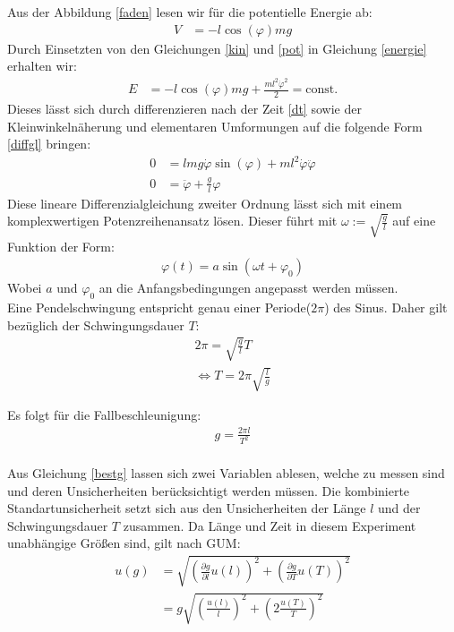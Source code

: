 Aus der Abbildung \ref{faden} lesen wir für die potentielle Energie ab:
\begin{align}
V&=-l \cos (\varphi) m g
\label{pot}
\end{align}
Durch Einsetzten von den Gleichungen \cref{kin} und \cref{pot} in Gleichung \cref{energie} erhalten wir:
\begin{align}
E&=-l \cos (\varphi) m g +\frac{ml^2\dot{\varphi}^2}{2}=\textrm{const.}
\end{align}
Dieses lässt sich durch differenzieren nach der Zeit \cref{dt} sowie der Kleinwinkelnäherung und elementaren Umformungen auf die folgende Form \cref{diffgl} bringen:
\begin{align}
	0&=lmg \dot{\varphi}\sin (\varphi) +ml^2 \dot{\varphi} \ddot{\varphi}
	\label{dt} \\
	0&=\ddot{\varphi}+\frac{g}{l} \varphi
	\label{diffgl}
\end{align}
Diese lineare Differenzialgleichung zweiter Ordnung lässt sich mit einem komplexwertigen Potenzreihenansatz lösen. Dieser führt mit $\omega:=\sqrt{\frac{g}{l}}$ auf eine Funktion der Form: 
\begin{align}
\varphi(t)=a \sin (\omega t + \varphi_0)
\end{align}
Wobei $a$ und $\varphi_0$ an die Anfangsbedingungen angepasst werden müssen.\\
Eine Pendelschwingung entspricht genau einer Periode($2\pi$) des Sinus. Daher gilt bezüglich der Schwingungsdauer $T$:
\begin{align}
	2\pi = \sqrt{\frac{g}{l}} T \\
	\Leftrightarrow T= 2 \pi \sqrt{\frac{l}{g}}
\end{align}

Es folgt für die Fallbeschleunigung:
\begin{align}
g=\frac{2 \pi l}{T^2}
\label{bestg}
\end{align}\\



Aus Gleichung \ref{bestg} lassen sich zwei Variablen ablesen, welche zu messen sind und deren Unsicherheiten berücksichtigt werden müssen. Die kombinierte Standartunsicherheit setzt sich aus den Unsicherheiten der Länge $l$ und der Schwingungsdauer $T$ zusammen. Da Länge und Zeit in diesem Experiment unabhängige Größen sind, gilt nach GUM:
\begin{align}
u(g)&=\sqrt{\left(\frac{\partial g}{\partial l} u(l)\right)^2 + \left(\frac{\partial g}{\partial T}u(T)\right)^2 } \\
   &= g \sqrt{\left(\frac{u(l)}{l}\right)^2+ \left(2 \frac{ u(T)}{T}\right)^2 }
   \label{kombu}
\end{align}  





